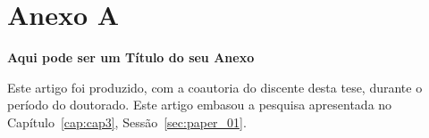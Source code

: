 \chapter{Anexo A}
\label{an:a}
\begin{center}
    \textbf{Aqui pode ser um Título do seu Anexo}
\end{center}

Este artigo foi produzido, com a coautoria do discente desta tese, durante o período do doutorado. Este artigo embasou a pesquisa apresentada no Capítulo~\ref{cap:cap3}, Sessão~\ref{sec:paper_01}.




